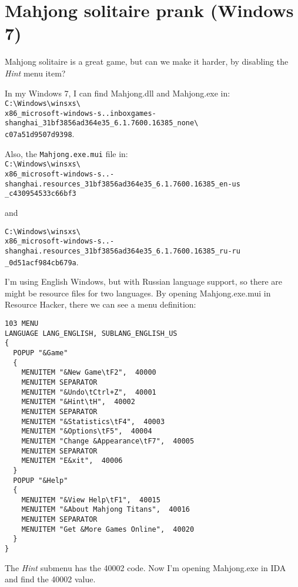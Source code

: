 ﻿\section{Mahjong solitaire prank (Windows 7)}

Mahjong solitaire is a great game, but can we make it harder, by disabling the \emph{Hint} menu item?

In my Windows 7, I can find Mahjong.dll and Mahjong.exe in:\\
\verb|C:\Windows\winsxs\| \\
\verb|x86_microsoft-windows-s..inboxgames-shanghai_31bf3856ad364e35_6.1.7600.16385_none\| \\
\verb|c07a51d9507d9398|.

Also, the \verb|Mahjong.exe.mui| file in:\\
\verb|C:\Windows\winsxs\| \\
\verb|x86_microsoft-windows-s..-shanghai.resources_31bf3856ad364e35_6.1.7600.16385_en-us| \\
\verb|_c430954533c66bf3|

and

\verb|C:\Windows\winsxs\| \\
\verb|x86_microsoft-windows-s..-shanghai.resources_31bf3856ad364e35_6.1.7600.16385_ru-ru| \\
\verb|_0d51acf984cb679a|.

I'm using English Windows, but with Russian language support, so there are might be resource files for two languages.
By opening Mahjong.exe.mui in Resource Hacker, there we can see a menu definition:

\begin{lstlisting}[caption=Menu resources from Mahjong.exe.mui]
103 MENU
LANGUAGE LANG_ENGLISH, SUBLANG_ENGLISH_US
{
  POPUP "&Game"
  {
    MENUITEM "&New Game\tF2",  40000
    MENUITEM SEPARATOR
    MENUITEM "&Undo\tCtrl+Z",  40001
    MENUITEM "&Hint\tH",  40002
    MENUITEM SEPARATOR
    MENUITEM "&Statistics\tF4",  40003
    MENUITEM "&Options\tF5",  40004
    MENUITEM "Change &Appearance\tF7",  40005
    MENUITEM SEPARATOR
    MENUITEM "E&xit",  40006
  }
  POPUP "&Help"
  {
    MENUITEM "&View Help\tF1",  40015
    MENUITEM "&About Mahjong Titans",  40016
    MENUITEM SEPARATOR
    MENUITEM "Get &More Games Online",  40020
  }
}
\end{lstlisting}

The \emph{Hint} submenu has the 40002 code.
Now I'm opening Mahjong.exe in IDA and find the 40002 value.

